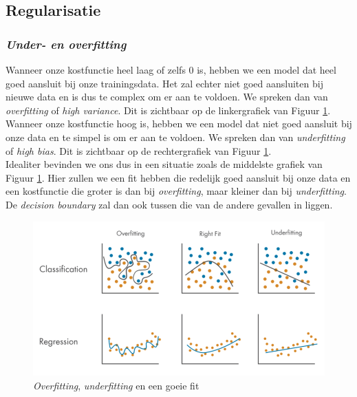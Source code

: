 \subsection{Regularisatie}
\subsubsection{\textit{Under- en overfitting}}
Wanneer onze kostfunctie heel laag of zelfs 0 is, hebben we een model dat heel goed aansluit bij onze trainingsdata. Het zal echter niet goed aansluiten bij nieuwe data en is dus te complex om er aan te voldoen. We spreken dan van \textit{overfitting} of \textit{high variance}. Dit is zichtbaar op de linkergrafiek van Figuur \ref{fig:overfitting-underfitting}. \\
\newline
Wanneer onze kostfunctie hoog is, hebben we een model dat niet goed aansluit bij onze data en te simpel is om er aan te voldoen. We spreken dan van \textit{underfitting} of \textit{high bias}. Dit is zichtbaar op de rechtergrafiek van Figuur \ref{fig:overfitting-underfitting}. \\
\newline
Idealiter bevinden we ons dus in een situatie zoals de middelste grafiek van Figuur \ref{fig:overfitting-underfitting}. Hier zullen we een fit hebben die redelijk goed aansluit bij onze data en een kostfunctie die groter is dan bij \textit{overfitting}, maar kleiner dan bij \textit{underfitting}. De \textit{decision boundary} zal dan ook tussen die van de andere gevallen in liggen.

\begin{figure}[h]
	\centering
	\includegraphics[width=\textwidth]{images/11-overfitting-underfitting.png}
	\caption{\textit{Overfitting}, \textit{underfitting} en een goeie fit}
	\label{fig:overfitting-underfitting}
\end{figure}

